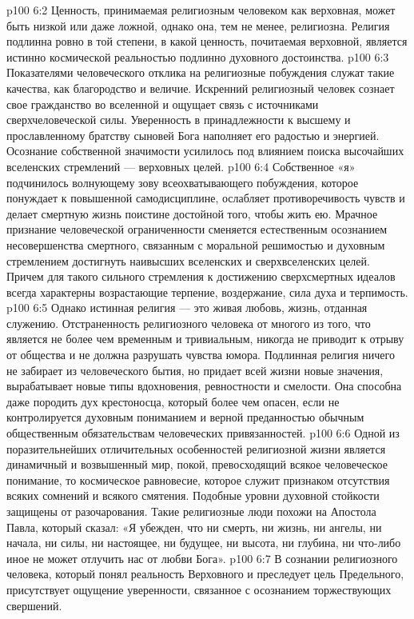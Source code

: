 \vs p100 6:2 Ценность, принимаемая религиозным человеком как верховная, может быть низкой или даже ложной, однако она, тем не менее, религиозна. Религия подлинна ровно в той степени, в какой ценность, почитаемая верховной, является истинно космической реальностью подлинно духовного достоинства.
\vs p100 6:3 Показателями человеческого отклика на религиозные побуждения служат такие качества, как благородство и величие. Искренний религиозный человек сознает свое гражданство во вселенной и ощущает связь с источниками сверхчеловеческой силы. Уверенность в принадлежности к высшему и прославленному братству сыновей Бога наполняет его радостью и энергией. Осознание собственной значимости усилилось под влиянием поиска высочайших вселенских стремлений --- верховных целей.
\vs p100 6:4 Собственное «я» подчинилось волнующему зову всеохватывающего побуждения, которое понуждает к повышенной самодисциплине, ослабляет противоречивость чувств и делает смертную жизнь поистине достойной того, чтобы жить ею. Мрачное признание человеческой ограниченности сменяется естественным осознанием несовершенства смертного, связанным с моральной решимостью и духовным стремлением достигнуть наивысших вселенских и сверхвселенских целей. Причем для такого сильного стремления к достижению сверхсмертных идеалов всегда характерны возрастающие терпение, воздержание, сила духа и терпимость.
\vs p100 6:5 Однако истинная религия --- это живая любовь, жизнь, отданная служению. Отстраненность религиозного человека от многого из того, что является не более чем временным и тривиальным, никогда не приводит к отрыву от общества и не должна разрушать чувства юмора. Подлинная религия ничего не забирает из человеческого бытия, но придает всей жизни новые значения, вырабатывает новые типы вдохновения, ревностности и смелости. Она способна даже породить дух крестоносца, который более чем опасен, если не контролируется духовным пониманием и верной преданностью обычным общественным обязательствам человеческих привязанностей.
\vs p100 6:6 \pc Одной из поразительнейших отличительных особенностей религиозной жизни является динамичный и возвышенный мир, покой, превосходящий всякое человеческое понимание, то космическое равновесие, которое служит признаком отсутствия всяких сомнений и всякого смятения. Подобные уровни духовной стойкости защищены от разочарования. Такие религиозные люди похожи на Апостола Павла, который сказал: «Я убежден, что ни смерть, ни жизнь, ни ангелы, ни начала, ни силы, ни настоящее, ни будущее, ни высота, ни глубина, ни что\hyp{}либо иное не может отлучить нас от любви Бога».
\vs p100 6:7 В сознании религиозного человека, который понял реальность Верховного и преследует цель Предельного, присутствует ощущение уверенности, связанное с осознанием торжествующих свершений.
